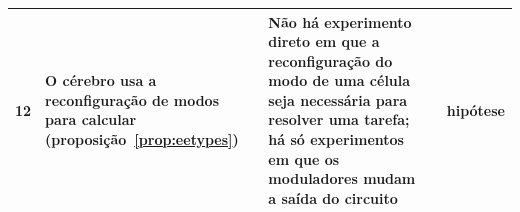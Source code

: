 {\begin{longtable}{>{\raggedright}p{0.5cm}>{\raggedright}p{4.0cm}>{\raggedright}p{5.6cm}>{\raggedright}p{2.3cm}>{\raggedright\arraybackslash}p{1.7cm}}
12 & O cérebro usa a reconfiguração de modos para calcular (proposição~\ref{prop:eetypes}) & Não há experimento direto em que a reconfiguração do modo de uma célula seja necessária para resolver uma tarefa; há só experimentos em que os moduladores mudam a saída do circuito & \cite{Marder2012} & hipótese \\
\bottomrule
\end{longtable}}
